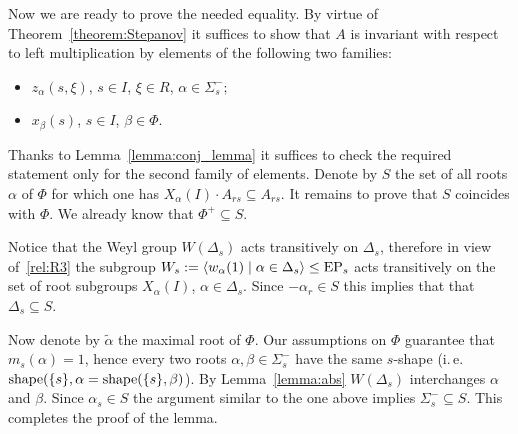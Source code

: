 
Now we are ready to prove the needed equality.
By virtue of Theorem~\ref{theorem:Stepanov} it suffices to show that $A$ is invariant with respect to left multiplication by elements of the following two families:
\begin{itemize} \item $z_{\alpha}(s, \xi)$, $s\in I$, $\xi \in R$, $\alpha\in\Sigma^-_s$;
 \item $x_{\beta}(s)$, $s \in I$, $\beta \in \Phi$. \end{itemize}
Thanks to Lemma~\ref{lemma:conj_lemma} it suffices to check the required statement only for the second family of elements.
Denote by $S$ the set of all roots $\alpha$ of $\Phi$ for which one has $X_{\alpha}(I)\cdot A_{rs}\subseteq A_{rs}$.
It remains to prove that $S$ coincides with $\Phi$. We already know that $\Phi^+ \subseteq S$.

Notice that the Weyl group $W(\Delta_s)$ acts transitively on $\Delta_s$, therefore in view of~\ref{rel:R3} the subgroup
$W_s := \langle w_\alpha(1) \mid \alpha\in\Delta_s\rangle \leq \operatorname{EP}_s$ acts transitively on the set of root subgroups $X_\alpha(I)$, $\alpha\in \Delta_s$.
Since $-\alpha_r\in S$ this implies that that $\Delta_s\subseteq S$.

Now denote by $\widetilde{\alpha}$ the maximal root of $\Phi$. Our assumptions on $\Phi$ guarantee that $m_s(\alpha)=1$, 
hence every two roots $\alpha, \beta \in \Sigma^-_s$ have the same $s$-shape (i.\,e. $\operatorname{shape}(\{s\}, \alpha = \operatorname{shape}(\{s\}, \beta)$).
By Lemma~\ref{lemma:abs} $W(\Delta_s)$ interchanges $\alpha$ and $\beta$. %
Since $\alpha_s \in S$ the argument similar to the one above implies $\Sigma^-_s\subseteq S$. This completes the proof of the lemma. 